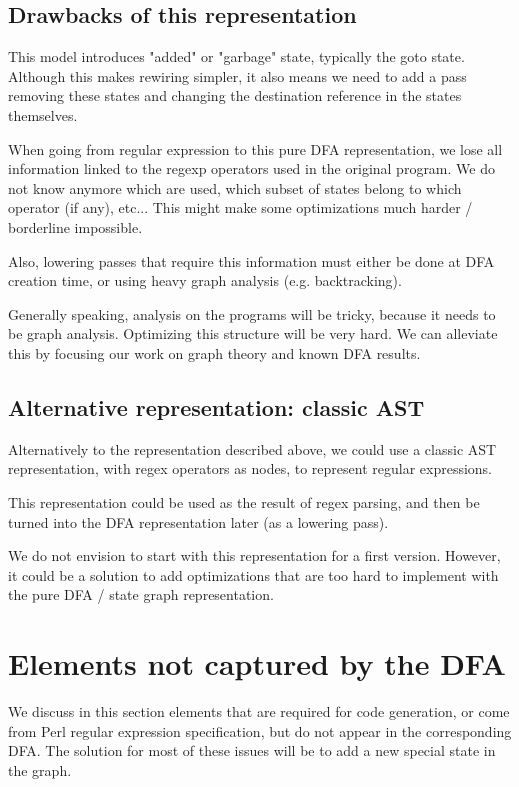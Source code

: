 \documentclass[11pt,a4paper]{report}
\newcommand{\haskell}[1]{\textsf{#1}}
\begin{document}
\subsection{Drawbacks of this representation}

This model introduces "added" or "garbage" state, typically the \haskell{goto} state. Although this makes rewiring simpler, it also means we need to add a pass removing these states and changing the destination reference in the states themselves.

When going from regular expression to this pure DFA representation, we lose all information linked to the regexp operators used in the original program. We do not know anymore which are used, which subset of states belong to which operator (if any), etc... This might make some optimizations much harder / borderline impossible.

Also, lowering passes that require this information must either be done at DFA creation time, or using heavy graph analysis (e.g. backtracking).

Generally speaking, analysis on the programs will be tricky, because it needs to be graph analysis. Optimizing this structure will be very hard. We can alleviate this by focusing our work on graph theory and known DFA results.

\subsection{Alternative representation: classic AST}

Alternatively to the representation described above, we could use a classic AST representation, with regex operators as nodes, to represent regular expressions.

This representation could be used as the result of regex parsing, and then be turned into the DFA representation later (as a lowering pass).

We do not envision to start with this representation for a first version. However, it could be a solution to add optimizations that are too hard to implement with the pure DFA / state graph representation.

\section{Elements not captured by the DFA}

\label{specialstates}

We discuss in this section elements that are required for code generation, or come from Perl regular expression specification, but do not appear in the corresponding DFA. The solution for most of these issues will be to add a new special state in the graph.
\end{document}

